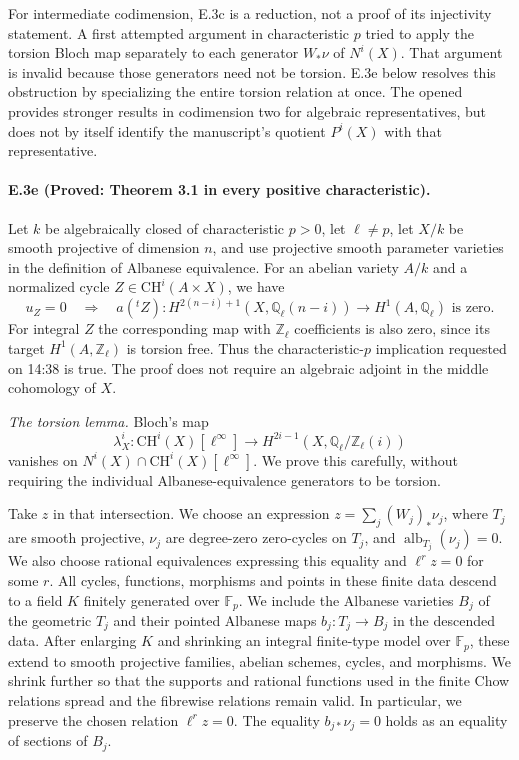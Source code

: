 For intermediate codimension, E.3c is a reduction, not a proof of
its injectivity statement. A first attempted argument in characteristic
$p$ tried to apply the torsion Bloch map separately to each generator
$W_*\nu$ of $N^i(X)$. That argument is invalid because those
generators need not be torsion. E.3e below resolves this obstruction
by specializing the entire torsion relation at once. The opened
\citet[Theorem 8.1, Proposition 8.2]{cyACMV2022} provides stronger
results in codimension two for algebraic representatives, but
does not by itself identify the manuscript's quotient $P^i(X)$
with that representative.

\paragraph{E.3e (Proved: Theorem 3.1 in every positive characteristic).}
Let $k$ be algebraically closed of characteristic $p>0$, let
$\ell\ne p$, let $X/k$ be smooth projective of dimension $n$, and
use projective smooth parameter varieties in the definition of
Albanese equivalence. For an abelian variety $A/k$ and a normalized
cycle $Z\in\mathrm{CH}^i(A\times X)$, we have
\[
 u_Z=0\quad\Longrightarrow\quad
 a({}^tZ):H^{2(n-i)+1}(X,\mathbb Q_\ell(n-i))
                       \longrightarrow H^1(A,\mathbb Q_\ell)
 \text{ is zero}.
\]
For integral $Z$ the corresponding map with $\mathbb Z_\ell$
coefficients is also zero, since its target $H^1(A,\mathbb Z_\ell)$
is torsion free. Thus the characteristic-$p$ implication requested
on 14:38 is true.
The proof does not require an algebraic adjoint in the middle
cohomology of $X$.

\emph{The torsion lemma.}
Bloch's map
\[
 \lambda_X^i:\mathrm{CH}^i(X)[\ell^\infty]
             \longrightarrow H^{2i-1}(X,\mathbb Q_\ell/\mathbb Z_\ell(i))
\]
vanishes on
$N^i(X)\cap\mathrm{CH}^i(X)[\ell^\infty]$.
We prove this carefully, without requiring the individual
Albanese-equivalence generators to be torsion.

Take $z$ in that intersection. We choose an expression
$z=\sum_j (W_j)_*\nu_j$, where $T_j$ are smooth projective,
$\nu_j$ are degree-zero zero-cycles on $T_j$, and
$\operatorname{alb}_{T_j}(\nu_j)=0$. We also choose rational
equivalences expressing this equality and $\ell^r z=0$ for some
$r$. All cycles, functions, morphisms and points in these finite
data descend to a field $K$ finitely generated over $\mathbb F_p$.
We include the Albanese varieties $B_j$ of the geometric $T_j$
and their pointed Albanese maps $b_j:T_j\to B_j$ in the descended
data. After enlarging $K$ and shrinking an integral finite-type
model over $\mathbb F_p$, these extend to smooth projective
families, abelian schemes, cycles, and morphisms. We shrink further
so that the supports and rational functions used in the finite
Chow relations spread and the fibrewise relations remain valid.
In particular, we preserve the chosen relation $\ell^r z=0$.
The equality
$b_{j*}\nu_j=0$ holds as an equality of sections of $B_j$.

